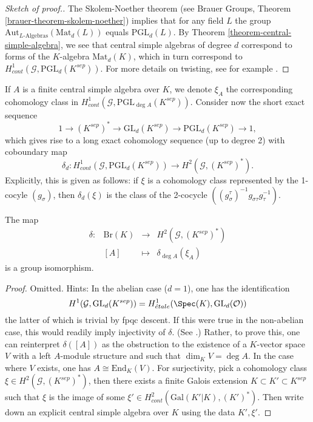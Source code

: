 \begin{proof}[Sketch of proof.]
The Skolem-Noether theorem (see
Brauer Groups, Theorem \ref{brauer-theorem-skolem-noether})
implies that for any field $L$ the group
$\text{Aut}_{L\text{-Algebras}}(\text{Mat}_d(L))$
equals $\text{PGL}_d(L)$. By
Theorem \ref{theorem-central-simple-algebra}, we see that
central simple algebras of degree $d$ correspond
to forms of the $K$-algebra $\text{Mat}_d(K)$, which in turn correspond to
$H_{cont}^1 (\mathcal{G}, \text{PGL}_d(K^{sep}))$. For more details on
twisting, see for example
\cite{SilvermanEllipticCurves}.
\end{proof}

\noindent
If $A$ is a finite central simple algebra over $K$, we denote $\xi_A$ the
corresponding cohomology class in $H_{cont}^1 (\mathcal{G}, \text{PGL}_{\deg
A}(K^{sep}))$. Consider now the short exact sequence
$$
1 \to (K^{sep})^* \to \text{GL}_d(K^{sep}) \to \text{PGL}_d(K^{sep}) \to 1,
$$
which gives rise to a long exact cohomology sequence (up to degree 2) with
coboundary map
$$
\delta_d : H_{cont} ^1(\mathcal{G}, \text{PGL}_d(K^{sep})) \to H^2
(\mathcal{G}, (K^{sep})^*).
$$
Explicitly, this is given as follows: if $\xi$ is a cohomology class
represented by the 1-cocyle $(g_\sigma)$, then $\delta_d(\xi)$ is the class of
the 2-cocycle $((g_\sigma^\tau)^{-1} g_{\sigma \tau} g_\tau^{-1})$.

\begin{theorem}
\label{theorem-brauer-delta}
The map
$$
\begin{matrix}
\delta : & \text{Br}(K) & \longrightarrow & H^2(\mathcal{G}, (K^{sep})^*) \\
& [A] & \longmapsto & \delta_{\deg A} (\xi_A)
\end{matrix}
$$
is a group isomorphism.
\end{theorem}

\begin{proof}
Omitted. Hints: In the abelian case ($d = 1$), one has the identification
$$
H^1 (\mathcal{G}, \text{GL}_d(K^{sep})) =
H_{\acute{e}tale}^1(\Spec(K), \text{GL}_d(\mathcal{O}))
$$
the latter of which is trivial by fpqc descent. If this were true in the
non-abelian case, this would readily imply injectivity of $\delta$. (See
\cite{SGA4.5}.) Rather, to prove this, one can reinterpret $\delta([A])$ as the
obstruction to the existence of a $K$-vector space $V$ with a left $A$-module
structure and such that $\dim_K V = \deg A$. In the case where $V$ exists, one
has $A \cong \text{End}_K(V)$. For surjectivity, pick a
cohomology class $\xi \in H^2(\mathcal{G}, (K^{sep})^*)$, then there exists a
finite Galois extension $K \subset K' \subset K^{sep}$ such that $\xi$ is
the image of some $\xi' \in H_{cont}^2(\text{Gal}(K'|K), (K')^*)$. Then write
down an explicit central simple algebra over $K$ using the data $K', \xi'$.
\end{proof}

